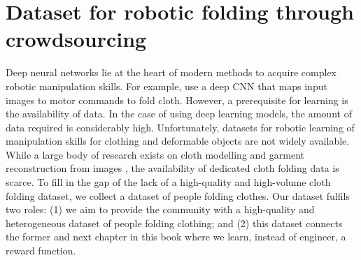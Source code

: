 \documentclass[\home/main.tex]{subfiles}
\begin{document}
\chapter{Dataset for robotic folding through crowdsourcing}\label{ch:data_collection}

Deep neural networks lie at the heart of modern methods to acquire complex robotic manipulation skills. For example, \textcite{Matas2018} use a deep \gls{CNN} that maps input images to motor commands to fold cloth. However, a prerequisite for learning is the availability of data. In the case of using deep learning models, the amount of data required is considerably high.
Unfortunately, datasets for robotic learning of manipulation skills for clothing and deformable objects are not widely available. While a large body of research exists on cloth modelling and garment reconstruction from images \autocite{bertiche2020cloth3d,deepfashion3d,Wang20183dgarment}, the availability of dedicated cloth folding data is scarce. To fill in the gap of the lack of a high-quality and high-volume cloth folding dataset, we collect a dataset of people folding clothes. Our dataset fulfils two roles: (1) we aim to provide the community with a high-quality and heterogeneous dataset of people folding clothing; and (2) this dataset connects the former and next chapter in this book where we learn, instead of engineer, a reward function.


\end{document}
